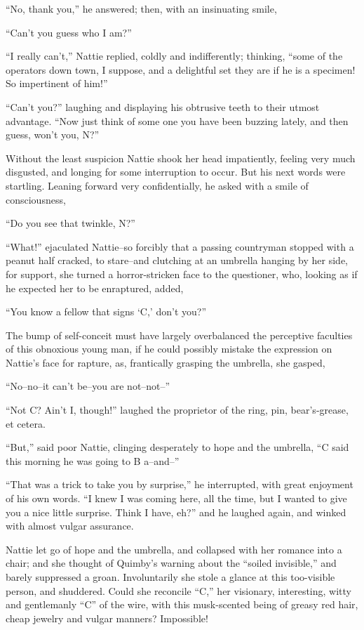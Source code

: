 ``No, thank you,'' he answered; then, with an insinuating smile,

``Can't you guess who I am?''

``I really can't,'' Nattie replied, coldly and indifferently; thinking,
``some of the operators down town, I suppose, and a delightful set they
are if he is a specimen! So impertinent of him!''

``Can't you?'' laughing and displaying his obtrusive teeth to their utmost
advantage. ``Now just think of some one you have been buzzing lately, and
then guess, won't you, N?''

Without the least suspicion Nattie shook her head impatiently, feeling
very much disgusted, and longing for some interruption to occur. But his
next words were startling. Leaning forward very confidentially, he asked
with a smile of consciousness,

``Do you see that twinkle, N?''

``What!'' ejaculated Nattie--so forcibly that a passing countryman stopped
with a peanut half cracked, to stare--and clutching at an umbrella
hanging by her side, for support, she turned a horror-stricken face to
the questioner, who, looking as if he expected her to be enraptured,
added,

``You know a fellow that signs `C,' don't you?''

The bump of self-conceit must have largely overbalanced the perceptive
faculties of this obnoxious young man, if he could possibly mistake the
expression on Nattie's face for rapture, as, frantically grasping the
umbrella, she gasped,

``No--no--it can't be--you are not--not--''

``Not C? Ain't I, though!'' laughed the proprietor of the ring, pin,
bear's-grease, et cetera.

``But,'' said poor Nattie, clinging desperately to hope and the umbrella,
``C said this morning he was going to B a--and--''

``That was a trick to take you by surprise,'' he interrupted, with great
enjoyment of his own words. ``I knew I was coming here, all the time, but
I wanted to give you a nice little surprise. Think I have, eh?'' and he
laughed again, and winked with almost vulgar assurance.

Nattie let go of hope and the umbrella, and collapsed with her romance
into a chair; and she thought of Quimby's warning about the ``soiled
invisible,'' and barely suppressed a groan. Involuntarily she stole a
glance at this too-visible person, and shuddered. Could she reconcile
``C,'' her visionary, interesting, witty and gentlemanly ``C'' of the wire,
with this musk-scented being of greasy red hair, cheap jewelry and
vulgar manners? Impossible!


